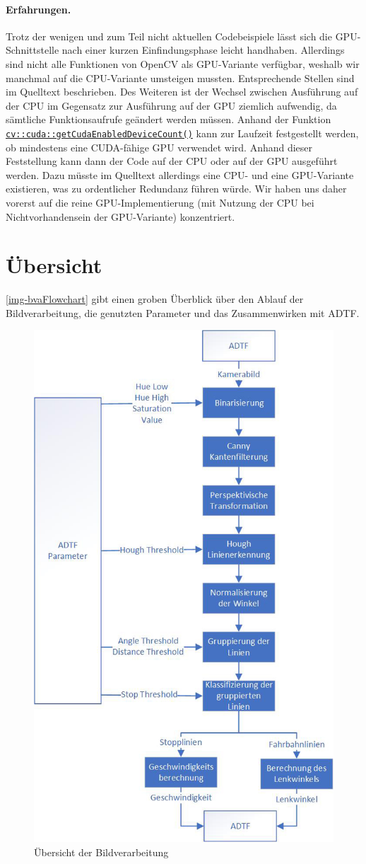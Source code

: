 \documentclass[a4paper,12pt]{report}
\begin{document}
	\paragraph{Erfahrungen.}
	Trotz der wenigen und zum Teil nicht aktuellen Codebeispiele lässt sich die GPU-Schnittstelle nach einer kurzen Einfindungsphase leicht handhaben. Allerdings sind nicht alle Funktionen von OpenCV als GPU-Variante verfügbar, weshalb wir manchmal auf die CPU-Variante umsteigen mussten. Entsprechende Stellen sind im Quelltext beschrieben. Des Weiteren ist der Wechsel zwischen Ausführung auf der CPU im Gegensatz zur Ausführung auf der GPU ziemlich aufwendig, da sämtliche Funktionsaufrufe geändert werden müssen. Anhand der Funktion \hyperlink{https://docs.opencv.org/trunk/d8/d40/group\_\_cudacore\_\_init.html\#gaaa93892f9189163e5d53790b4b1e88db}{\texttt{cv::cuda::getCudaEnabled\-DeviceCount()}} kann zur Laufzeit festgestellt werden, ob mindestens eine CUDA-fähige GPU verwendet wird. Anhand dieser Feststellung kann dann der Code auf der CPU oder auf der GPU ausgeführt werden. Dazu müsste im Quelltext allerdings eine CPU- und eine GPU-Variante existieren, was zu ordentlicher Redundanz führen würde. Wir haben uns daher vorerst auf die reine GPU-Implementierung (mit Nutzung der CPU bei Nichtvorhandensein der GPU-Variante) konzentriert.

\pagebreak

\section{Übersicht}
	\autoref{img-bvaFlowchart} gibt einen groben Überblick über den Ablauf der Bildverarbeitung, die genutzten Parameter und das Zusammenwirken mit ADTF.

	\begin{figure}[ht]
		\centering
		\includegraphics[width=.6\textwidth,keepaspectratio]{assets/bvaFlowchart.jpg}
		\caption{Übersicht der Bildverarbeitung}
		\label{img-bvaFlowchart}
	\end{figure}
\end{document}
